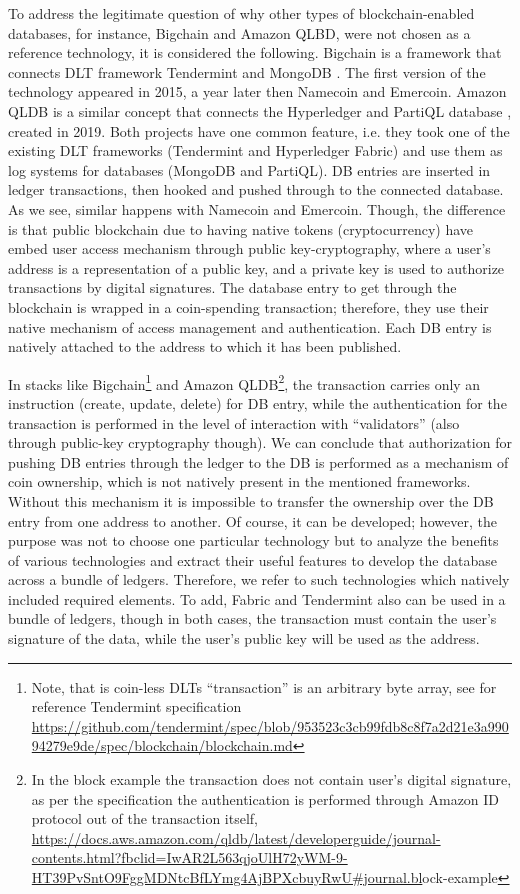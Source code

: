 \begin{multicols}{2}
To address the legitimate question of why other types of blockchain-enabled databases, for instance, Bigchain and Amazon QLBD, were not chosen as a reference technology, it is considered the following. Bigchain is a framework that connects DLT framework Tendermint and MongoDB \cite{art1-key25}. The first version of the technology appeared in 2015, a year later then Namecoin and Emercoin. Amazon QLDB is a similar concept that connects the Hyperledger and PartiQL database \cite{art1-key26}, created in 2019. Both projects have one common feature, i.e. they took one of the existing DLT frameworks (Tendermint and Hyperledger Fabric) and use them as log systems for databases (MongoDB and PartiQL). DB entries are inserted in ledger transactions, then hooked and pushed through to the connected database. As we see, similar happens with Namecoin and Emercoin. Though, the difference is that public blockchain due to having native tokens (cryptocurrency) have embed user access mechanism through public key-cryptography, where a user’s address is a representation of a public key, and a private key is used to authorize transactions by digital signatures. The database entry to get through the blockchain is wrapped in a coin-spending transaction; therefore, they use their native mechanism of access management and authentication. Each DB entry is natively attached to the address to which it has been published.

In stacks like Bigchain\footnote{Note, that is coin-less DLTs “transaction” is an arbitrary byte array, see for reference Tendermint specification \url{https://github.com/tendermint/spec/blob/953523c3cb99fdb8c8f7a2d21e3a99094279e9de/spec/blockchain/blockchain.md}} and Amazon QLDB\footnote{In the block example the transaction does not contain user’s digital signature, as per the specification the authentication is performed through Amazon ID protocol out of the transaction itself, \url{https://docs.aws.amazon.com/qldb/latest/developerguide/journal-contents.html?fbclid=IwAR2L563qjoUlH72yWM-9-HT39PvSntO9FggMDNtcBfLYmg4AjBPXcbuyRwU\#journal.bl}ock-example}, the transaction carries only an instruction (create, update, delete) for DB entry, while the authentication for the transaction is performed in the level of interaction with “validators” (also through public-key cryptography though). We can conclude that authorization for pushing DB entries through the ledger to the DB is performed as a mechanism of coin ownership, which is not natively present in the mentioned frameworks. Without this mechanism it is impossible to transfer the ownership over the DB entry from one address to another. Of course, it can be developed; however, the purpose was not to choose one particular technology but to analyze the benefits of various technologies and extract their useful features to develop the database across a bundle of ledgers. Therefore, we refer to such technologies which natively included required elements. To add, Fabric and Tendermint also can be used in a bundle of ledgers, though in both cases, the transaction must contain the user’s signature of the data, while the user’s public key will be used as the address.


\end{multicols}

